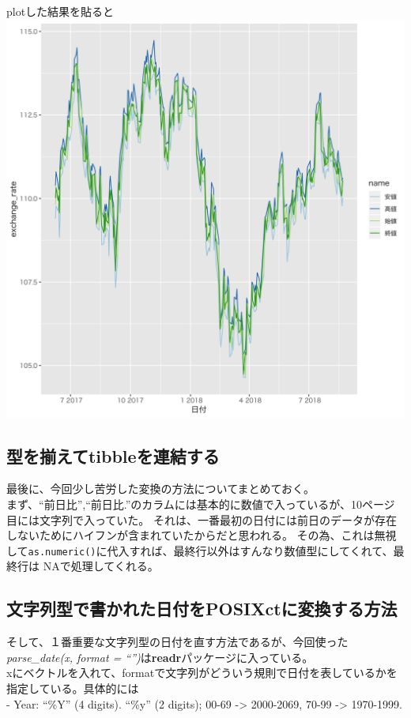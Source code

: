 \documentclass[]{article}
\begin{document}
plotした結果を貼ると \includegraphics{yen-dollar.png}

\subsection{型を揃えてtibbleを連結する}\label{tibble}

最後に、今回少し苦労した変換の方法についてまとめておく。\\
まず、``前日比'',``前日比.''のカラムには基本的に数値で入っているが、10ページ目には文字列で入っていた。
それは、一番最初の日付には前日のデータが存在しないためにハイフンが含まれていたからだと思われる。
その為、これは無視して\texttt{as.numeric()}に代入すれば、最終行以外はすんなり数値型にしてくれて、最終行は
NAで処理してくれる。

\subsection{文字列型で書かれた日付をPOSIXctに変換する方法}\label{posixct}

そして、１番重要な文字列型の日付を直す方法であるが、今回使った\emph{parse\_date(x,
format = ``'')}は\textbf{readr}パッケージに入っている。\\
xにベクトルを入れて、formatで文字列がどういう規則で日付を表しているかを指定している。具体的には\\
- Year: ``\%Y'' (4 digits). ``\%y'' (2 digits); 00-69 -\textgreater{}
2000-2069, 70-99 -\textgreater{} 1970-1999.
\end{document}
